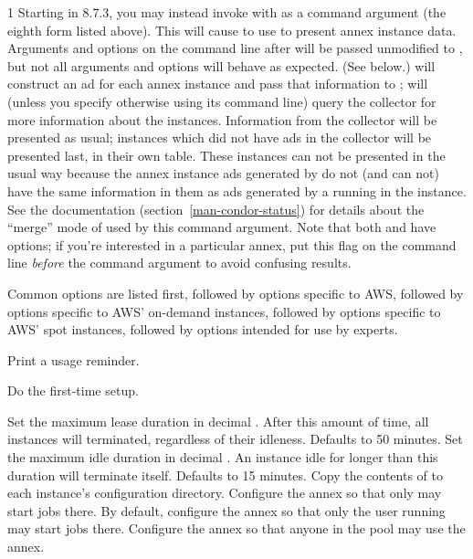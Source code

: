 \begin{ManPage}{\label{man-condor-annex}}{1}
Starting in 8.7.3, you may instead invoke  with 
as a command argument (the eighth form listed above).  This will cause  to use 
to present annex instance data.  Arguments and options on the command line
after  will be passed unmodified to , but not
all arguments and options will behave as expected.  (See below.)
 will construct an ad for each annex instance and pass that
information to ;  will (unless you specify
otherwise using its command line) query the collector for more information
about the instances.  Information from the collector will be presented as
usual; instances which did not have ads in the collector will be presented
last, in their own table.  These instances can not be presented in the
usual way because the annex instance ads generated by  do not
(and can not) have the same information in them as ads generated by a
 running in the instance.  See the 
documentation (section~\ref{man-condor-status}) for details about the ``merge'' mode of
 used by this command argument.  Note that both 
and  have  options; if you're interested
in a particular annex, put this flag on the command line \emph{before}
the  command argument to avoid confusing results.

Common options are listed first, followed by options specific to AWS,
followed by options specific to AWS' on-demand instances, followed by
options specific to AWS' spot instances, followed by options intended
for use by experts.

\begin{Options}
		{Print a usage reminder.}

		{Do the first-time setup.}

		{Set the maximum lease duration in decimal .  After this amount of time, all instances will terminated, regardless of their idleness.  Defaults to 50 minutes.}
		{Set the maximum idle duration in decimal .  An instance idle for longer than this duration will terminate itself.  Defaults to 15 minutes.}
		{Copy the contents of  to each instance's configuration directory.}
		{Configure the annex so that only  may start jobs there.  By default, configure the annex so that only the user running  may start jobs there.}
		{Configure the annex so that anyone in the pool may use the annex.}


\end{Options}
\end{ManPage}
